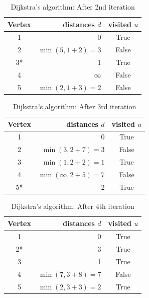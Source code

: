 \documentclass[a4paper,11pt]{book}
\begin{document}
\begin{table}[H]
\centering
\begin{tabular}{|c|r|c|}
\hline
\multicolumn{1}{|l|}{\textbf{Vertex}} & \textbf{distances  $d$} & \textbf{visited $u$} \\ \hline
1   & 0             & True     \\ 
2   & $\min(5, 1+2)=3$      & False     \\ 
3*   & 1      & True     \\ 
4   &  $\infty$     & False     \\ 
5   & $\min(2, 1+3)=2$      & False     \\ \hline
\end{tabular}
\caption{Dijkstra's algorithm: After 2nd iteration}
\end{table}

\begin{table}[H]
\centering
\begin{tabular}{|c|r|c|}
\hline
\multicolumn{1}{|l|}{\textbf{Vertex}} & \textbf{distances  $d$} & \textbf{visited $u$} \\ \hline
1   & 0             & True     \\ 
2   & $\min(3, 2+7) = 3$      & False     \\ 
3   & $\min(1, 2+2) = 1$      & True     \\ 
4   & $\min(\infty, 2+5) = 7$      & False     \\ 
5*   & 2      & True     \\ \hline
\end{tabular}
\caption{Dijkstra's algorithm: After 3rd iteration}
\end{table}

\begin{table}[H]
\centering
\begin{tabular}{|c|r|c|}
\hline
\multicolumn{1}{|l|}{\textbf{Vertex}} & \textbf{distances  $d$} & \textbf{visited $u$} \\ \hline
1   & 0             & True     \\ 
2*   & 3      & True     \\ 
3   & 1      & True     \\ 
4   & $\min(7, 3+8)= 7$      & False     \\ 
5   & $\min(2, 3+3)= 2$      & True     \\ \hline
\end{tabular}
\caption{Dijkstra's algorithm: After 4th iteration}
\end{table}
\end{document}
